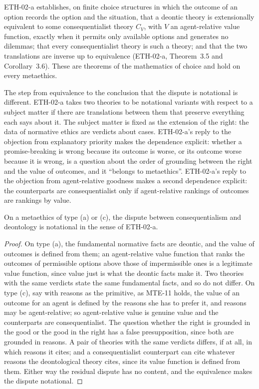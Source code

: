 \documentclass{situationist-preprint}
\begin{document}
ETH-02-a establishes, on finite choice structures in which the outcome of an option records the option and the situation, that a deontic theory is extensionally equivalent to some consequentialist theory $C_V$, with $V$ an agent-relative value function, exactly when it permits only available options and generates no dilemmas; that every consequentialist theory is such a theory; and that the two translations are inverse up to equivalence (ETH-02-a, Theorem~3.5 and Corollary~3.6). These are theorems of the mathematics of choice and hold on every metaethics.

The step from equivalence to the conclusion that the dispute is notational is different. ETH-02-a takes two theories to be notational variants with respect to a subject matter if there are translations between them that preserve everything each says about it. The subject matter is fixed as the extension of the right: the data of normative ethics are verdicts about cases. ETH-02-a's reply to the objection from explanatory priority makes the dependence explicit: whether a promise-breaking is wrong because its outcome is worse, or its outcome worse because it is wrong, is a question about the order of grounding between the right and the value of outcomes, and it \enquote{belongs to metaethics}. ETH-02-a's reply to the objection from agent-relative goodness \citep{Schroeder2007} makes a second dependence explicit: the counterparts are consequentialist only if agent-relative rankings of outcomes are rankings by value.

\begin{proposition}\label{p:verdict}
On a metaethics of type (a) or (c), the dispute between consequentialism and deontology is notational in the sense of ETH-02-a.
\end{proposition}

\begin{proof}
On type (a), the fundamental normative facts are deontic, and the value of outcomes is defined from them; an agent-relative value function that ranks the outcomes of permissible options above those of impermissible ones is a legitimate value function, since value just is what the deontic facts make it. Two theories with the same verdicts state the same fundamental facts, and so do not differ. On type (c), say with reasons as the primitive, as MTE-11 holds, the value of an outcome for an agent is defined by the reasons she has to prefer it, and reasons may be agent-relative; so agent-relative value is genuine value and the counterparts are consequentialist. The question whether the right is grounded in the good or the good in the right has a false presupposition, since both are grounded in reasons. A pair of theories with the same verdicts differs, if at all, in which reasons it cites; and a consequentialist counterpart can cite whatever reasons the deontological theory cites, since its value function is defined from them. Either way the residual dispute has no content, and the equivalence makes the dispute notational.
\end{proof}
\end{document}
